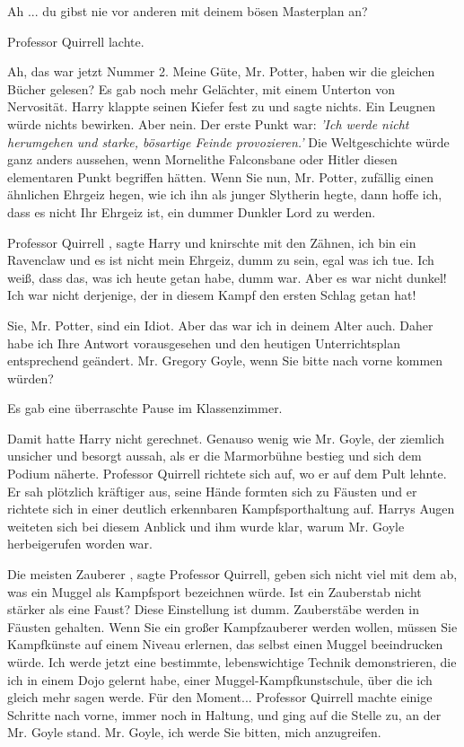 \glqq Ah ... du gibst nie vor anderen mit deinem bösen Masterplan an?\grqq{}

Professor Quirrell lachte.

\glqq Ah, das war jetzt Nummer 2. Meine Güte, Mr. Potter, haben wir die gleichen
Bücher gelesen?\grqq{} Es gab noch mehr Gelächter, mit einem Unterton von
Nervosität. Harry klappte seinen Kiefer fest zu und sagte nichts. Ein Leugnen
würde nichts bewirken. \glqq Aber nein. Der erste Punkt war: \emph{'Ich werde
nicht herumgehen und starke, bösartige Feinde provozieren.'} Die Weltgeschichte
würde ganz anders aussehen, wenn Mornelithe Falconsbane oder Hitler diesen
elementaren Punkt begriffen hätten. Wenn Sie nun, Mr. Potter, zufällig einen
ähnlichen Ehrgeiz hegen, wie ich ihn als junger Slytherin hegte, dann hoffe ich,
dass es nicht Ihr Ehrgeiz ist, ein dummer Dunkler Lord zu werden.\grqq{}

\glqq Professor Quirrell\grqq{} , sagte Harry und knirschte mit den Zähnen,
\glqq ich bin ein Ravenclaw und es ist nicht mein Ehrgeiz, dumm zu sein, egal
was ich tue. Ich weiß, dass das, was ich heute getan habe, dumm war. Aber es war
nicht dunkel! Ich war nicht derjenige, der in diesem Kampf den ersten Schlag
getan hat!\grqq{}

\glqq Sie, Mr. Potter, sind ein Idiot. Aber das war ich in deinem Alter auch.
Daher habe ich Ihre Antwort vorausgesehen und den heutigen Unterrichtsplan
entsprechend geändert. Mr. Gregory Goyle, wenn Sie bitte nach vorne kommen
würden?\grqq{}

Es gab eine überraschte Pause im Klassenzimmer.

Damit hatte Harry nicht gerechnet. Genauso wenig wie Mr. Goyle, der ziemlich
unsicher und besorgt aussah, als er die Marmorbühne bestieg und sich dem Podium
näherte. Professor Quirrell richtete sich auf, wo er auf dem Pult lehnte. Er sah
plötzlich kräftiger aus, seine Hände formten sich zu Fäusten und er richtete
sich in einer deutlich erkennbaren Kampfsporthaltung auf. Harrys Augen weiteten
sich bei diesem Anblick und ihm wurde klar, warum Mr. Goyle herbeigerufen worden
war.

\glqq Die meisten Zauberer\grqq{} , sagte Professor Quirrell, \glqq geben sich
nicht viel mit dem ab, was ein Muggel als Kampfsport bezeichnen würde. Ist ein
Zauberstab nicht stärker als eine Faust? Diese Einstellung ist dumm. Zauberstäbe
werden in Fäusten gehalten. Wenn Sie ein großer Kampfzauberer werden wollen,
müssen Sie Kampfkünste auf einem Niveau erlernen, das selbst einen Muggel
beeindrucken würde. Ich werde jetzt eine bestimmte, lebenswichtige Technik
demonstrieren, die ich in einem Dojo gelernt habe, einer
Muggel-Kampfkunstschule, über die ich gleich mehr sagen werde. Für den
Moment...\grqq{} Professor Quirrell machte einige Schritte nach vorne, immer
noch in Haltung, und ging auf die Stelle zu, an der Mr. Goyle stand. \glqq Mr.
Goyle, ich werde Sie bitten, mich anzugreifen.\grqq{}

